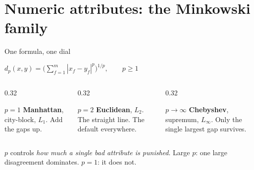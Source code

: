 \documentclass[aspectratio=169]{beamer}
\begin{document}
\section[Minkowski]{Numeric attributes: the Minkowski family}
\label{sec:mink}

\begin{frame}{One formula, one dial}
  \begin{exampleblock}{}
    \centering\large
    $\displaystyle d_p(x,y) = \Big( \sum_{f=1}^{m} |x_f - y_f|^p
    \Big)^{1/p}, \qquad p \ge 1$
  \end{exampleblock}
  \vspace{0.3em}
  \begin{columns}[T]
    \begin{column}{0.32\textwidth}
      \begin{block}{$p = 1$}
        \textbf{Manhattan}, city-block, $L_1$. Add the gaps up.
      \end{block}
    \end{column}
    \begin{column}{0.32\textwidth}
      \begin{block}{$p = 2$}
        \textbf{Euclidean}, $L_2$. The straight line. The default
        everywhere.
      \end{block}
    \end{column}
    \begin{column}{0.32\textwidth}
      \begin{block}{$p \to \infty$}
        \textbf{Chebyshev}, supremum, $L_\infty$. Only the single largest
        gap survives.
      \end{block}
    \end{column}
  \end{columns}
  \vspace{0.4em}
  \begin{center}
    \small $p$ controls \emph{how much a single bad attribute is punished}.
    Large $p$: one large disagreement dominates. $p=1$: it does not.
  \end{center}
\end{frame}
\end{document}
